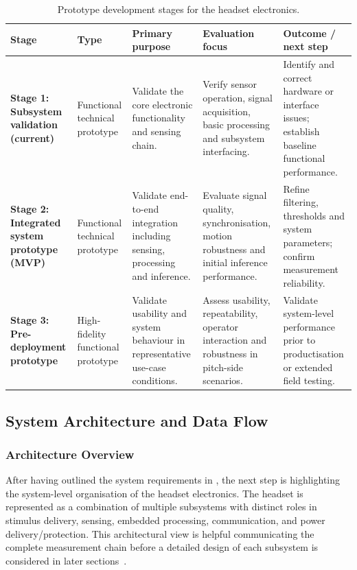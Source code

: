 \begin{table}[htbp]
    \centering
    \caption{Prototype development stages for the headset electronics.}
    \label{tab:prototype-stages}
    \small
    \begin{tabular}{p{2.6cm}p{2.4cm}p{3cm}p{3cm}p{3cm}}
        \toprule
        \textbf{Stage} & \textbf{Type} & \textbf{Primary purpose} & \textbf{Evaluation focus} & \textbf{Outcome / next step} \\
        \midrule
        \textbf{Stage 1: Subsystem validation (current)} & Functional technical prototype & Validate the core electronic functionality and sensing chain. & Verify sensor operation, signal acquisition, basic processing and subsystem interfacing. & Identify and correct hardware or interface issues; establish baseline functional performance. \\
        \midrule
        \textbf{Stage 2: Integrated system prototype (MVP)} & Functional technical prototype & Validate end-to-end integration including sensing, processing and inference. & Evaluate signal quality, synchronisation, motion robustness and initial inference performance. & Refine filtering, thresholds and system parameters; confirm measurement reliability. \\
        \midrule
        \textbf{Stage 3: Pre-deployment prototype} & High-fidelity functional prototype & Validate usability and system behaviour in representative use-case conditions. & Assess usability, repeatability, operator interaction and robustness in pitch-side scenarios. & Validate system-level performance prior to productisation or extended field testing. \\
        \bottomrule
    \end{tabular}
\end{table}


\subsection{System Architecture and Data Flow}

\subsubsection{Architecture Overview}

After having outlined the system requirements in , the next step is highlighting the system-level organisation of the headset electronics. The headset is represented as a combination of multiple subsystems with distinct roles in stimulus delivery, sensing, embedded processing, communication, and power delivery/protection. This architectural view is helpful communicating the complete measurement chain before a detailed design of each subsystem is considered in later sections~\cite{blanchard2011systems}.

